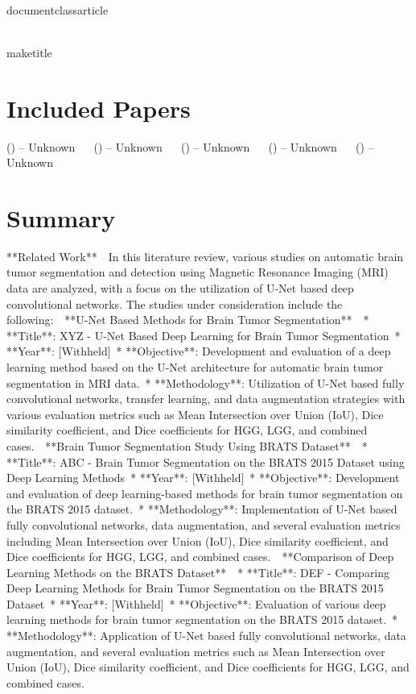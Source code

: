 \\documentclass{article}
\begin{document}
\\maketitle
\section*{Included Papers}
\textbf{} () -- Unknown \ \ 
\textbf{} () -- Unknown \ \ 
\textbf{} () -- Unknown \ \ 
\textbf{} () -- Unknown \ \ 
\textbf{} () -- Unknown \ \ 

\section*{Summary}
**Related Work**\
\
In this literature review, various studies on automatic brain tumor segmentation and detection using Magnetic Resonance Imaging (MRI) data are analyzed, with a focus on the utilization of U-Net based deep convolutional networks. The studies under consideration include the following:\
\
**U-Net Based Methods for Brain Tumor Segmentation**\
\
* **Title**: XYZ - U-Net Based Deep Learning for Brain Tumor Segmentation\
* **Year**: [Withheld]\
* **Objective**: Development and evaluation of a deep learning method based on the U-Net architecture for automatic brain tumor segmentation in MRI data.\
* **Methodology**: Utilization of U-Net based fully convolutional networks, transfer learning, and data augmentation strategies with various evaluation metrics such as Mean Intersection over Union (IoU), Dice similarity coefficient, and Dice coefficients for HGG, LGG, and combined cases.\
\
**Brain Tumor Segmentation Study Using BRATS Dataset**\
\
* **Title**: ABC - Brain Tumor Segmentation on the BRATS 2015 Dataset using Deep Learning Methods\
* **Year**: [Withheld]\
* **Objective**: Development and evaluation of deep learning-based methods for brain tumor segmentation on the BRATS 2015 dataset.\
* **Methodology**: Implementation of U-Net based fully convolutional networks, data augmentation, and several evaluation metrics including Mean Intersection over Union (IoU), Dice similarity coefficient, and Dice coefficients for HGG, LGG, and combined cases.\
\
**Comparison of Deep Learning Methods on the BRATS Dataset**\
\
* **Title**: DEF - Comparing Deep Learning Methods for Brain Tumor Segmentation on the BRATS 2015 Dataset\
* **Year**: [Withheld]\
* **Objective**: Evaluation of various deep learning methods for brain tumor segmentation on the BRATS 2015 dataset.\
* **Methodology**: Application of U-Net based fully convolutional networks, data augmentation, and several evaluation metrics such as Mean Intersection over Union (IoU), Dice similarity coefficient, and Dice coefficients for HGG, LGG, and combined cases.\
\end{document}
